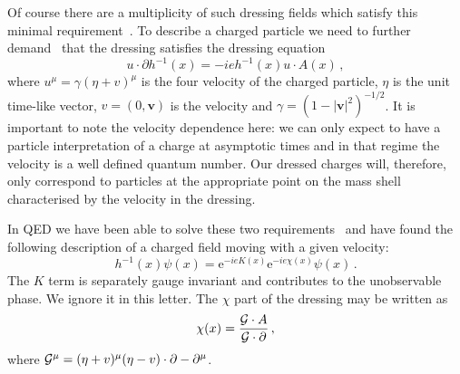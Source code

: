 \documentclass[12pt,a4paper]{article}
\newcommand{\cd}{\cdot}
\newcommand{\pa}{\partial}
\newcommand{\G}{{\cal G}}
\newcommand{\ee}{\mathrm{e}}
\newcommand{\vb}{{\boldsymbol v}}
\begin{document}
Of course there are a multiplicity of such dressing fields which
satisfy this minimal
requirement~\cite{Dirac:1955ca,Lavelle:1997ty}. To describe a
charged particle we need to further
demand~\cite{Bagan:1997kg} that the dressing
satisfies the dressing equation
\begin{equation}\label{4de}
  u\cd\pa h^{-1}(x)=-ieh^{-1}(x)u\cd A(x)\,,
\end{equation}
where $u^\mu=\gamma(\eta+v)^\mu$ is the four velocity of the charged particle,
$\eta$ is the unit time-like vector, $v=(0,\vb)$ is the velocity
and $\gamma=(1-|\vb|^2)^{-1/2}$.
It is important to note the velocity dependence here: we can only
expect to have a particle interpretation of a charge at asymptotic
times and in that regime the velocity is a well defined quantum
number. Our dressed charges will, therefore, only correspond to particles at the
appropriate point on the mass shell characterised by the velocity in
the dressing.


In QED we have been able to solve these two
requirements~\cite{Bagan:1997kg,Bagan:1999jf} and have found the
following description of a charged field moving with a given
velocity:
\begin{equation}\label{4sol}
  h^{-1}(x)\psi(x)=\ee^{-ieK(x)}\ee^{-ie\chi(x)}\psi(x)\,.
\end{equation}
The $K$ term is separately gauge invariant and contributes to the
unobservable phase. We ignore it in this letter. The $\chi$ part of the
dressing may be written as
\begin{equation}\label{4min}
  \chi(x)=\frac{\G\cd A}{\G\cd\pa}\,,
\end{equation}
where  $\G^\mu=(\eta+v)^\mu(\eta-v)\cd\pa-\pa^\mu$.
\end{document}
